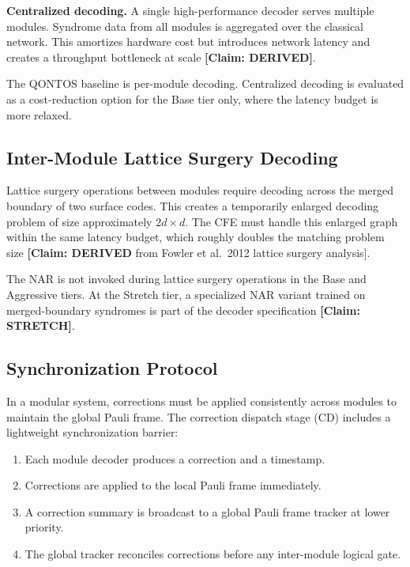 \documentclass[conference]{IEEEtran}
\begin{document}
\textbf{Centralized decoding.} A single high-performance decoder serves multiple modules. Syndrome data from all modules is aggregated over the classical network. This amortizes hardware cost but introduces network latency and creates a throughput bottleneck at scale \textbf{[Claim: DERIVED]}.

The QONTOS baseline is per-module decoding. Centralized decoding is evaluated as a cost-reduction option for the Base tier only, where the latency budget is more relaxed.

\subsection{Inter-Module Lattice Surgery Decoding}

Lattice surgery operations between modules require decoding across the merged boundary of two surface codes. This creates a temporarily enlarged decoding problem of size approximately $2d \times d$. The CFE must handle this enlarged graph within the same latency budget, which roughly doubles the matching problem size \textbf{[Claim: DERIVED} from Fowler et al.\ 2012 lattice surgery analysis].

The NAR is not invoked during lattice surgery operations in the Base and Aggressive tiers. At the Stretch tier, a specialized NAR variant trained on merged-boundary syndromes is part of the decoder specification \textbf{[Claim: STRETCH]}.

\subsection{Synchronization Protocol}

In a modular system, corrections must be applied consistently across modules to maintain the global Pauli frame. The correction dispatch stage (CD) includes a lightweight synchronization barrier:

\begin{enumerate}
\item Each module decoder produces a correction and a timestamp.
\item Corrections are applied to the local Pauli frame immediately.
\item A correction summary is broadcast to a global Pauli frame tracker at lower priority.
\item The global tracker reconciles corrections before any inter-module logical gate.
\end{enumerate}
\end{document}
